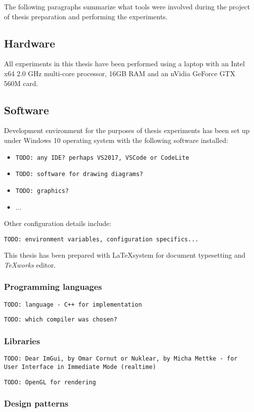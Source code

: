\documentclass[12pt]{report}
\newcommand{\todo}[1]{}
\renewcommand{\todo}[1]{{\color{red} \par \noindent \footnotesize \texttt{TODO: {#1} }}}
\begin{document}
The following paragraphs summarize what tools were involved during the project of thesis preparation and performing the experiments.

\subsection{Hardware} 

All experiments in this thesis have been performed using a laptop with an Intel x64 2.0 GHz multi-core processor, 16GB RAM and an nVidia GeForce GTX 560M card.
 
\subsection{Software} 

Development environment for the purposes of thesis experiments has been set up under Windows 10 operating system with the following software installed:

\begin{itemize}
	\item \todo{any IDE? perhaps VS2017, VSCode or CodeLite  }
	\item \todo{software for drawing diagrams?}
	\item \todo{graphics?}
	\item ...
\end{itemize}

Other configuration details include:
\todo{environment variables, configuration specifics...}

This thesis has been prepared with \LaTeX\space system for document typesetting and \textit{TeXworks} editor.

 
\subsubsection{Programming languages} 
\todo{language - C++ for implementation }
\todo{which compiler was chosen?}



\subsubsection{Libraries} 
\todo{Dear ImGui, by Omar Cornut  or Nuklear, by Micha Mettke - for User Interface in Immediate Mode (realtime)}

\todo{OpenGL for rendering}

\subsubsection{Design patterns} 
\end{document}
